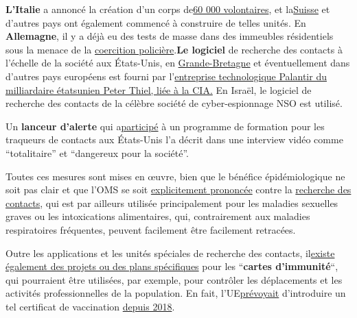 \textbf{L'Italie} a annoncé la création d'un corps
de\href{https://www.thelocal.it/20200525/italy-seeks-60000-volunteers-to-enforce-coronavirus-rules}{60
000 volontaires}, et
la\href{https://www.nzz.ch/zuerich/coronavirus-in-zuerich-contact-tracing-ist-gut-angelaufen-ld.1556846}{Suisse}
et d'autres pays ont également commencé à construire de telles unités.
En \textbf{Allemagne}, il y a déjà eu des tests de masse dans des
immeubles résidentiels sous la menace de la
\href{https://www.youtube.com/watch?v=6ZQFpnskP8g}{coercition
policière}.\textbf{Le logiciel} de recherche des contacts à l'échelle de
la société aux États-Unis, en
\href{https://www.telegraph.co.uk/technology/2020/05/16/inside-story-cia-backed-palantir-embedded-nhs-socialite-running/}{Grande-Bretagne}
et éventuellement dans d'autres pays européens est fourni par
l'\href{https://techcrunch.com/2020/04/01/palantir-coronavirus-cdc-nhs-gotham-foundry/}{entreprise
technologique Palantir du milliardaire étatsunien Peter Thiel, liée à la
CIA.} En Israël, le logiciel de recherche des contacts de la célèbre
société de cyber-espionnage NSO est utilisé.

Un \textbf{lanceur d'alerte} qui
a\href{https://www.youtube.com/watch?v=qFUyZWw7qoc}{participé} à un
programme de formation pour les traqueurs de contacts aux États-Unis l'a
décrit dans une interview vidéo comme ``totalitaire'' et ``dangereux
pour la société''.

Toutes ces mesures sont mises en œuvre, bien que le bénéfice
épidémiologique ne soit pas clair et que l'OMS se soit
\href{https://apps.who.int/iris/bitstream/handle/10665/329438/9789241516839-eng.pdf}{explicitement
prononcée} contre la
\href{https://apps.who.int/iris/bitstream/handle/10665/329438/9789241516839-eng.pdf}{recherche
des contacts}, qui est par ailleurs utilisée principalement pour les
maladies sexuelles graves ou les intoxications alimentaires, qui,
contrairement aux maladies respiratoires fréquentes, peuvent facilement
être facilement retracées.

Outre les applications et les unités spéciales de recherche des
contacts,
il\href{https://www.msn.com/en-us/news/world/the-uk-government-is-in-talks-with-facial-recognition-firms-to-develop-covid-19-immunity-passports/ar-BB12J6It}{existe
également des projets ou des plans spécifiques} pour les
``\textbf{cartes d'immunité}``, qui pourraient être utilisées, par
exemple, pour contrôler les déplacements et les activités
professionnelles de la population. En fait,
l'UE\href{https://off-guardian.org/2020/05/22/report-eu-planning-vaccination-passport-since-2018/}{prévoyait}
d'introduire un tel certificat de vaccination
\href{https://off-guardian.org/2020/05/22/report-eu-planning-vaccination-passport-since-2018/}{depuis
2018}.

